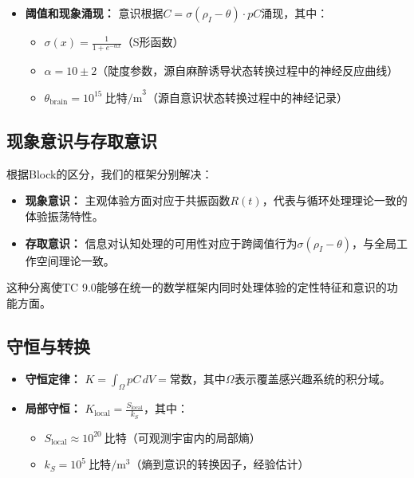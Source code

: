 \documentclass[12pt]{article}
\newcommand{\bit}{\text{比特}}
\begin{document}
\begin{CJK}{UTF8}{gbsn}
\begin{itemize}
    \item \textbf{阈值和现象涌现：} 意识根据$C = \sigma(\rho_I - \theta) \cdot pC$涌现，其中：
    \begin{itemize}[label=--]
        \item $\sigma(x) = \frac{1}{1 + e^{-\alpha x}}$（S形函数）
        \item $\alpha = 10 \pm 2$（陡度参数，源自麻醉诱导状态转换过程中的神经反应曲线\cite{chennu2014,storm2017}）
        \item $\theta_{\text{brain}} = 10^{15}~\text{比特/m}^3$（源自意识状态转换过程中的神经记录\cite{tononi2016,mashour2020}）
    \end{itemize}
\end{itemize}

\subsection{现象意识与存取意识}
根据Block的区分\cite{block2007}，我们的框架分别解决：

\begin{itemize}
    \item \textbf{现象意识：} 主观体验方面对应于共振函数$R(t)$，代表与循环处理理论一致的体验振荡特性\cite{lamme2006}。
    
    \item \textbf{存取意识：} 信息对认知处理的可用性对应于跨阈值行为$\sigma(\rho_I - \theta)$，与全局工作空间理论一致\cite{dehaene2011}。
\end{itemize}

这种分离使TC 9.0能够在统一的数学框架内同时处理体验的定性特征和意识的功能方面。

\subsection{守恒与转换}
\begin{itemize}
    \item \textbf{守恒定律：} $K = \int_{\Omega} pC \, dV = \text{常数}$，其中$\Omega$表示覆盖感兴趣系统的积分域。
    
    \item \textbf{局部守恒：} $K_{\text{local}} = \frac{S_{\text{local}}}{k_S}$，其中：
    \begin{itemize}[label=--]
        \item $S_{\text{local}} \approx 10^{20}~\bit$（可观测宇宙内的局部熵\cite{susskind1995}）
        \item $k_S = 10^{5}~\bit/\text{m}^3$（熵到意识的转换因子，经验估计）
    \end{itemize}
    

\end{itemize}
\end{CJK}
\end{document}

